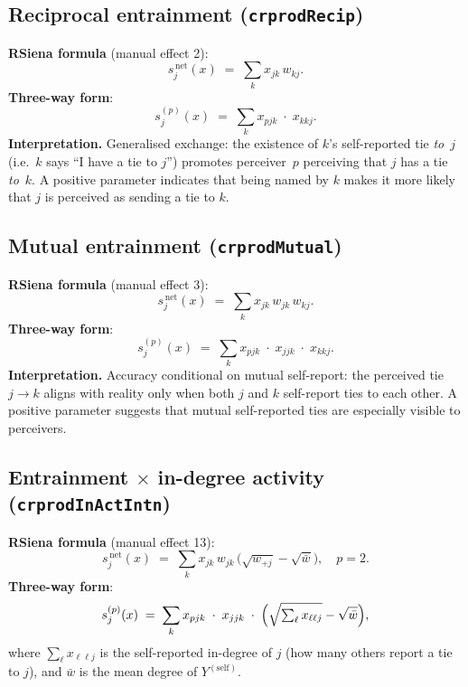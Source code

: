 \documentclass[11pt]{article}
\newcommand{\self}{\mathrm{self}}
\begin{document}
\subsection{Reciprocal entrainment (\texttt{crprodRecip})}

\textbf{RSiena formula} (manual effect 2):
\[
  s_{j}^{\,\mathrm{net}}(x) \;=\; \sum_{k} x_{jk}\, w_{kj}.
\]
\textbf{Three-way form}:
\[
  s_{j}^{(p)}(x) \;=\; \sum_{k} x_{pjk} \;\cdot\; x_{kkj}.
\]
\textbf{Interpretation.}
Generalised exchange:
the existence of $k$'s self-reported tie \emph{to}~$j$
(i.e.\ $k$ says ``I have a tie to $j$'')
promotes perceiver~$p$ perceiving that $j$ has a tie \emph{to}~$k$.
A positive parameter indicates that being named by $k$ makes it more
likely that $j$ is perceived as sending a tie to $k$.

\subsection{Mutual entrainment (\texttt{crprodMutual})}

\textbf{RSiena formula} (manual effect 3):
\[
  s_{j}^{\,\mathrm{net}}(x) \;=\; \sum_{k} x_{jk}\, w_{jk}\, w_{kj}.
\]
\textbf{Three-way form}:
\[
  s_{j}^{(p)}(x) \;=\; \sum_{k} x_{pjk} \;\cdot\; x_{jjk} \;\cdot\; x_{kkj}.
\]
\textbf{Interpretation.}
Accuracy conditional on mutual self-report:
the perceived tie $j \to k$ aligns with reality only when both $j$ and $k$
self-report ties to each other.
A positive parameter suggests that mutual self-reported ties are
especially visible to perceivers.

\subsection{Entrainment $\times$ in-degree activity (\texttt{crprodInActIntn})}

\textbf{RSiena formula} (manual effect 13):
\[
  s_{j}^{\,\mathrm{net}}(x) \;=\;
    \sum_{k} x_{jk}\, w_{jk}\,
    \bigl(\sqrt{w_{+j}} - \sqrt{\bar{w}}\bigr),
    \quad p = 2.
\]
\textbf{Three-way form}:
\[
  s_{j}^{(p)}(x) \;=\;
    \sum_{k} x_{pjk} \;\cdot\; x_{jjk} \;\cdot\;
    \Bigl(\sqrt{\textstyle\sum_{\ell} x_{\ell\ell j}}
          - \sqrt{\bar{w}}\Bigr),
\]
where $\sum_{\ell} x_{\ell\ell j}$ is the self-reported in-degree of $j$
(how many others report a tie to $j$), and $\bar{w}$ is the mean degree
of $Y^{(\self)}$.
\end{document}
